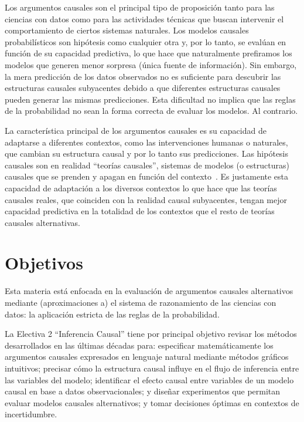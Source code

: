 \documentclass[10pt]{article}
\begin{document}

Los argumentos causales son el principal tipo de proposición tanto para las ciencias con datos como para las actividades técnicas que buscan intervenir el comportamiento de ciertos sistemas naturales.
Los modelos causales probabilísticos son hipótesis como cualquier otra y, por lo tanto, se evalúan en función de su capacidad predictiva, lo que hace que naturalmente prefiramos los modelos que generen menor sorpresa (única fuente de información).
Sin embargo, la mera predicción de los datos observados no es suficiente para descubrir las estructuras causales subyacentes debido a que diferentes estructuras causales pueden generar las mismas predicciones.
Esta dificultad no implica que las reglas de la probabilidad no sean la forma correcta de evaluar los modelos.
Al contrario.


La característica principal de los argumentos causales es su capacidad de adaptarse a diferentes contextos, como las intervenciones humanas o naturales, que cambian su estructura causal y por lo tanto sus predicciones.
Las hipótesis causales son en realidad ``teorías causales'', sistemas de modelos (o estructuras) causales que se prenden y apagan en función del contexto~\cite{winn2012-causality}.
Es justamente esta capacidad de adaptación a los diversos contextos lo que hace que las teorías causales reales, que coinciden con la realidad causal subyacentes, tengan mejor capacidad predictiva en la totalidad de los contextos que el resto de teorías causales alternativas.

%
\section{Objetivos}

\begin{mdframed}
Esta materia está enfocada en la evaluación de argumentos causales alternativos mediante (aproximaciones a) el sistema de razonamiento de las ciencias con datos: la aplicación estricta de las reglas de la probabilidad.
\end{mdframed}


La Electiva 2 ``Inferencia Causal'' tiene por principal objetivo revisar los métodos desarrollados en las últimas décadas para: especificar matemáticamente los argumentos causales expresados en lenguaje natural mediante métodos gráficos intuitivos; precisar cómo la estructura causal influye en el flujo de inferencia entre las variables del modelo; identificar el efecto causal entre variables de un modelo causal en base a datos observacionales; y diseñar experimentos que permitan evaluar modelos causales alternativos; y tomar decisiones óptimas en contextos de incertidumbre.
\end{document}
